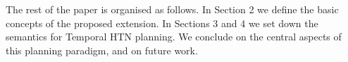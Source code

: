 \documentclass[letterpaper]{article} %
\begin{document}
The rest of the paper is organised as follows. In Section 2 we define the basic concepts of the proposed extension. In Sections 3 and 4 we set down the semantics for Temporal HTN planning. We conclude on the central aspects of this planning paradigm, and on future work. %






\end{document}
